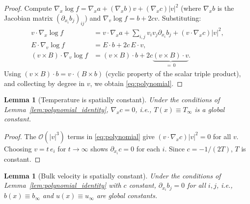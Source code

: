 \documentclass[11pt]{article}
\newtheorem{lemma}[theorem]{Lemma}
\begin{document}
\begin{proof}
Compute $\nabla_x \log f = \nabla_x a + (\nabla_x b) v + (\nabla_x c)|v|^2$ (where $\nabla_x b$ is the Jacobian matrix $(\partial_{x_i} b_j)_{ij}$) and $\nabla_v \log f = b + 2cv$. Substituting:
\begin{align*}
v \cdot \nabla_x \log f &= v \cdot \nabla_x a + \sum_{i,j} v_i v_j \partial_{x_i} b_j + (v \cdot \nabla_x c)|v|^2, \\
E \cdot \nabla_v \log f &= E \cdot b + 2c \, E \cdot v, \\
(v \times B) \cdot \nabla_v \log f &= (v \times B) \cdot b + 2c \underbrace{(v \times B) \cdot v}_{= \, 0}.
\end{align*}
Using $(v \times B) \cdot b = v \cdot (B \times b)$ (cyclic property of the scalar triple product), and collecting by degree in $v$, we obtain \eqref{eq:polynomial}.
\end{proof}

\begin{lemma}[Temperature is spatially constant]
\label{lem:T_constant}
Under the conditions of Lemma~\ref{lem:polynomial_identity}, $\nabla_x c = 0$, i.e., $T(x) \equiv T_\infty$ is a global constant.
\end{lemma}

\begin{proof}
The $\mathcal{O}(|v|^3)$ terms in \eqref{eq:polynomial} give $(v \cdot \nabla_x c)|v|^2 = 0$ for all $v$. Choosing $v = t \, e_i$ for $t \to \infty$ shows $\partial_{x_i} c = 0$ for each $i$. Since $c = -1/(2T)$, $T$ is constant.
\end{proof}

\begin{lemma}[Bulk velocity is spatially constant]
\label{lem:u_constant}
Under the conditions of Lemma~\ref{lem:polynomial_identity} with $c$ constant, $\partial_{x_i} b_j = 0$ for all $i, j$, i.e., $b(x) \equiv b_\infty$ and $u(x) \equiv u_\infty$ are global constants.
\end{lemma}
\end{document}
